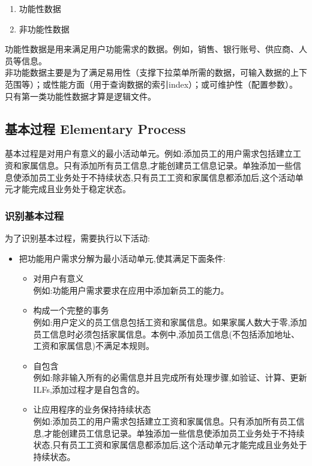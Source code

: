\begin{enumerate}
\tightlist
\item
  功能性数据
\item
  非功能性数据
\end{enumerate}

功能性数据是用来满足用户功能需求的数据。例如，销售、银行账号、供应商、人员等信息。\\
非功能数据主要是为了满足易用性（支撑下拉菜单所需的数据，可输入数据的上下范围等）；或性能方面（用于查询数据的索引index）；或可维护性（配置参数）。\\
只有第一类功能性数据才算是逻辑文件。\\

\hypertarget{ux57faux672cux8fc7ux7a0b-elementary-process}{%
\subsection{基本过程 Elementary
Process}\label{ux57faux672cux8fc7ux7a0b-elementary-process}}

基本过程是对用户有意义的最小活动单元。例如:添加员工的用户需求包括建立工资和家属信息。只有添加所有员工信息,才能创建员工信息记录。单独添加一些信息使添加员工业务处于不持续状态,只有员工工资和家属信息都添加后,这个活动单元才能完成且业务处于稳定状态。

\hypertarget{ux8bc6ux522bux57faux672cux8fc7ux7a0b}{%
\subsubsection{识别基本过程}\label{ux8bc6ux522bux57faux672cux8fc7ux7a0b}}

为了识别基本过程，需要执行以下活动:

\begin{itemize}
\tightlist
\item
  把功能用户需求分解为最小活动单元,使其满足下面条件:

  \begin{itemize}
  \tightlist
  \item
    对用户有意义\\
    例如:功能用户需求要求在应用中添加新员工的能力。\\
  \item
    构成一个完整的事务\\
    例如:用户定义的员工信息包括工资和家属信息。如果家属人数大于零,添加员工信息时必须包括家属信息。本例中,添加员工信息(不包括添加地址、工资和家属信息)不满足本规则。\\
  \item
    自包含\\
    例如:除非输入所有的必需信息并且完成所有处理步骤,如验证、计算、更新ILFs,添加过程才是自包含的。\\
  \item
    让应用程序的业务保持持续状态\\
    例如:添加员工的用户需求包括建立工资和家属信息。只有添加所有员工信息,才能创建员工信息记录。单独添加一些信息使添加员工业务处于不持续状态,只有员工工资和家属信息都添加后,这个活动单元才能完成且业务处于持续状态。\\
  \end{itemize}
\end{itemize}

